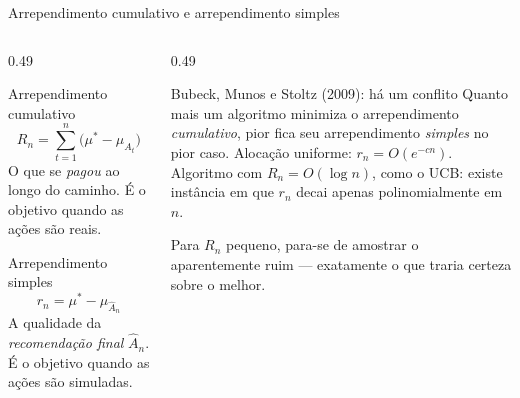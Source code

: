 \documentclass[aspectratio=169, 10pt]{beamer}
\begin{document}
\begin{frame}{Arrependimento cumulativo e arrependimento simples}
  \small
  \begin{columns}[T]
    \begin{column}{0.49\textwidth}
      \begin{defbox}{Arrependimento cumulativo}
        \[ R_n = \sum_{t=1}^{n}\bigl(\mu^{*} - \mu_{A_t}\bigr) \]
        O que se \emph{pagou} ao longo do caminho. É o objetivo quando as ações
        são reais.
      \end{defbox}
      \begin{defbox}{Arrependimento simples}
        \[ r_n = \mu^{*} - \mu_{\widehat{A}_n} \]
        A qualidade da \emph{recomendação final} $\widehat{A}_n$. É o objetivo
        quando as ações são simuladas.
      \end{defbox}
    \end{column}
    \begin{column}{0.49\textwidth}
      \begin{teobox}{Bubeck, Munos e Stoltz (2009): há um conflito}
        Quanto mais um algoritmo minimiza o arrependimento \emph{cumulativo}, pior
        fica seu arrependimento \emph{simples} no pior caso.
        \smallskip
        Alocação uniforme: $r_n = O(e^{-cn})$.\\
        Algoritmo com $R_n = O(\log n)$, como o UCB: existe instância em que
        $r_n$ decai apenas \alert{polinomialmente} em $n$.
      \end{teobox}
      \begin{ideiabox}
        Para $R_n$ pequeno, para-se de amostrar o aparentemente ruim — exatamente o que traria certeza sobre o melhor.
      \end{ideiabox}
    \end{column}
  \end{columns}
\end{frame}
\end{document}
